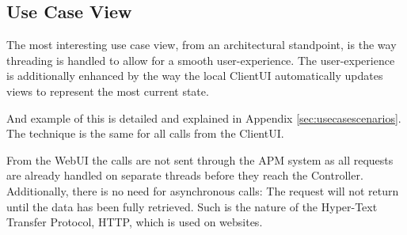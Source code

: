 \subsection{Use Case View}

The most interesting use case view, from an architectural standpoint, is the way threading is handled
to allow for a smooth user-experience. The user-experience is additionally enhanced by the way the
local ClientUI automatically updates views to represent the most current state.

And example of this is detailed and explained in Appendix \ref{sec:usecasescenarios}. The technique
is the same for all calls from the ClientUI.

From the WebUI the calls are not sent through the APM system as all requests are already handled on
separate threads before they reach the Controller. Additionally, there is no need for asynchronous calls:
The request will not return until the data has been fully retrieved. Such is the nature of the Hyper-Text
Transfer Protocol, HTTP, which is used on websites.